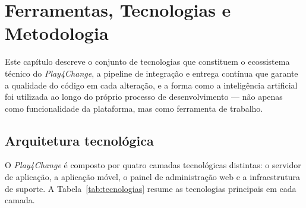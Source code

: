 %
%
\chapter{Ferramentas, Tecnologias e Metodologia}
\label{cha:ferramentas}

Este capítulo descreve o conjunto de tecnologias que constituem o ecossistema técnico do \emph{Play4Change}, a pipeline de integração e entrega contínua que garante a qualidade do código em cada alteração, e a forma como a inteligência artificial foi utilizada ao longo do próprio processo de desenvolvimento --- não apenas como funcionalidade da plataforma, mas como ferramenta de trabalho.

\section{Arquitetura tecnológica}
\label{sec:tecnologias}

O \emph{Play4Change} é composto por quatro camadas tecnológicas distintas: o servidor de aplicação, a aplicação móvel, o painel de administração web e a infraestrutura de suporte. A Tabela~\ref{tab:tecnologias} resume as tecnologias principais em cada camada.

